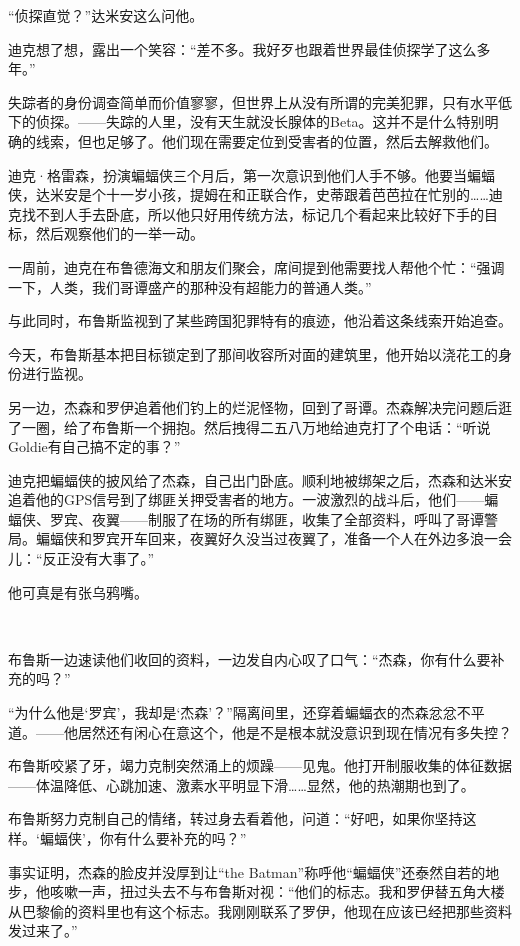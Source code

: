 \documentclass[../main]{subfiles}
\begin{document}
“侦探直觉？”达米安这么问他。

迪克想了想，露出一个笑容：“差不多。我好歹也跟着世界最佳侦探学了这么多年。”

失踪者的身份调查简单而价值寥寥，但世界上从没有所谓的完美犯罪，只有水平低下的侦探。——失踪的人里，没有天生就没长腺体的Beta。这并不是什么特别明确的线索，但也足够了。他们现在需要定位到受害者的位置，然后去解救他们。

迪克·格雷森，扮演蝙蝠侠三个月后，第一次意识到他们人手不够。他要当蝙蝠侠，达米安是个十一岁小孩，提姆在和正联合作，史蒂跟着芭芭拉在忙别的……迪克找不到人手去卧底，所以他只好用传统方法，标记几个看起来比较好下手的目标，然后观察他们的一举一动。

一周前，迪克在布鲁德海文和朋友们聚会，席间提到他需要找人帮他个忙：“强调一下，人类，我们哥谭盛产的那种没有超能力的普通人类。”

与此同时，布鲁斯监视到了某些跨国犯罪特有的痕迹，他沿着这条线索开始追查。

今天，布鲁斯基本把目标锁定到了那间收容所对面的建筑里，他开始以浇花工的身份进行监视。

另一边，杰森和罗伊追着他们钓上的烂泥怪物，回到了哥谭。杰森解决完问题后逛了一圈，给了布鲁斯一个拥抱。然后拽得二五八万地给迪克打了个电话：“听说Goldie有自己搞不定的事？”

迪克把蝙蝠侠的披风给了杰森，自己出门卧底。顺利地被绑架之后，杰森和达米安追着他的GPS信号到了绑匪关押受害者的地方。一波激烈的战斗后，他们——蝙蝠侠、罗宾、夜翼——制服了在场的所有绑匪，收集了全部资料，呼叫了哥谭警局。蝙蝠侠和罗宾开车回来，夜翼好久没当过夜翼了，准备一个人在外边多浪一会儿：“反正没有大事了。”

他可真是有张乌鸦嘴。

~\

布鲁斯一边速读他们收回的资料，一边发自内心叹了口气：“杰森，你有什么要补充的吗？”

“为什么他是‘罗宾’，我却是‘杰森’？”隔离间里，还穿着蝙蝠衣的杰森忿忿不平道。——他居然还有闲心在意这个，他是不是根本就没意识到现在情况有多失控？

布鲁斯咬紧了牙，竭力克制突然涌上的烦躁——见鬼。他打开制服收集的体征数据——体温降低、心跳加速、激素水平明显下滑……显然，他的热潮期也到了。

布鲁斯努力克制自己的情绪，转过身去看着他，问道：“好吧，如果你坚持这样。‘蝙蝠侠’，你有什么要补充的吗？”

事实证明，杰森的脸皮并没厚到让“the
Batman”称呼他“蝙蝠侠”还泰然自若的地步，他咳嗽一声，扭过头去不与布鲁斯对视：“他们的标志。我和罗伊替五角大楼从巴黎偷的资料里也有这个标志。我刚刚联系了罗伊，他现在应该已经把那些资料发过来了。”
\end{document}
